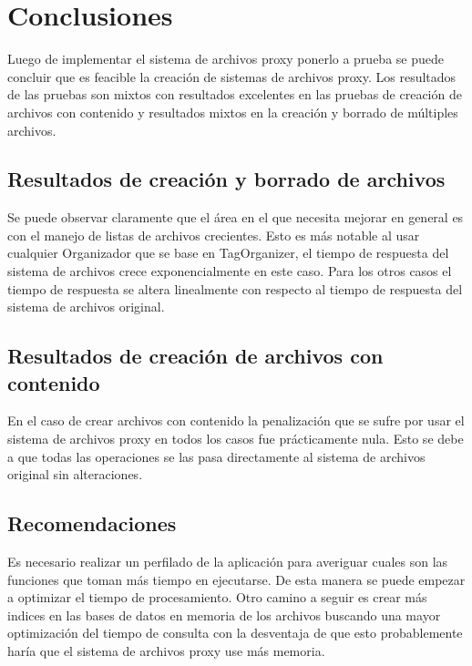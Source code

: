 \def\baselinestretch{1}
\chapter{Conclusiones}
\ifpdf
    \graphicspath{{Conclusions/ConclusionsFigs/PNG/}{Conclusions/ConclusionsFigs/PDF/}{Conclusions/ConclusionsFigs/}}
\else
    \graphicspath{{Conclusions/ConclusionsFigs/EPS/}{Conclusions/ConclusionsFigs/}}
\fi

Luego de implementar el sistema de archivos proxy ponerlo a prueba se puede concluir que es feacible la creación de sistemas de archivos proxy. Los resultados de las pruebas son mixtos con resultados excelentes en las pruebas de creación de archivos con contenido y resultados mixtos en la creación y borrado de múltiples archivos.

\section{Resultados de creación y borrado de archivos}

Se puede observar claramente que el área en el que necesita mejorar en general es con el manejo de listas de archivos crecientes. Esto es más notable al usar cualquier Organizador que se base en TagOrganizer, el tiempo de respuesta del sistema de archivos crece exponencialmente en este caso. Para los otros casos el tiempo de respuesta se altera linealmente con respecto al tiempo de respuesta del sistema de archivos original.

\section{Resultados de creación de archivos con contenido}

En el caso de crear archivos con contenido la penalización que se sufre por usar el sistema de archivos proxy en todos los casos fue prácticamente nula. Esto se debe a que todas las operaciones se las pasa directamente al sistema de archivos original sin alteraciones.

\section{Recomendaciones}

Es necesario realizar un perfilado de la aplicación para averiguar cuales son las funciones que toman más tiempo en ejecutarse. De esta manera se puede empezar a optimizar el tiempo de procesamiento. Otro camino a seguir es crear más indices en las bases de datos en memoria de los archivos buscando una mayor optimización del tiempo de consulta con la desventaja de que esto probablemente haría que el sistema de archivos proxy use más memoria.



